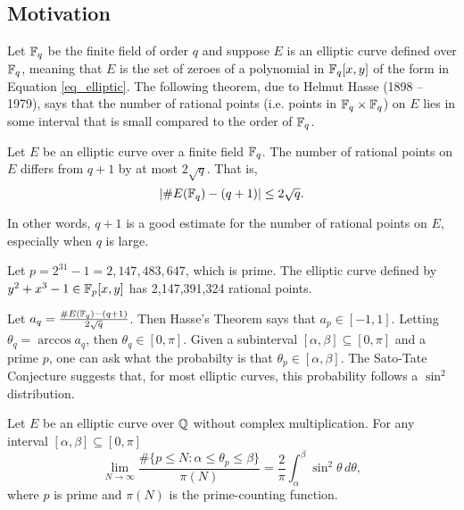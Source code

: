 \subsection{Motivation}

Let $\mathbb{F}_q$ be the finite field of order $q$ and suppose $E$ is an elliptic curve defined over $\mathbb{F}_q$,
meaning that $E$ is the set of zeroes of a polynomial in $\mathbb{F}_q[x,y]$ of the form in Equation \ref{eq_elliptic}.
The following theorem, due to Helmut Hasse (1898 -- 1979), says that
the number of rational points (i.e. points in $\mathbb{F}_q \times \mathbb{F}_q$) on $E$
lies in some interval that is small compared to the order of $\mathbb{F}_q$.
\begin{theorem}[Hasse]
  Let $E$ be an elliptic curve over a finite field $\mathbb{F}_q$.
  The number of rational points on $E$ differs from $q + 1$ by at most $2 \sqrt q$. That is,
  \[ | \#E(\mathbb{F}_q) - (q + 1) | \leq 2 \sqrt q. \]
\end{theorem}
In other words,
$q + 1$ is a good estimate for the number of rational points on $E$,
especially when $q$ is large.

\begin{example}
  Let $p = 2^{31} - 1 = 2,147,483,647$, which is prime.
  The elliptic curve defined by $y^2 + x^3 - 1 \in \mathbb{F}_p[x,y]$ has 2,147,391,324 rational points.
\end{example}

Let $a_q = \frac {\#E(\mathbb{F}_q) - (q + 1)} {2\sqrt q}$.
Then Hasse's Theorem says that $a_p \in [-1, 1]$.
Letting $\theta_q = \arccos a_q$, then $\theta_q \in [0, \pi]$.
Given a subinterval $[\alpha, \beta] \subseteq [0, \pi]$ and a prime $p$,
one can ask what the probabilty is that $\theta_p \in [\alpha, \beta]$.
The Sato-Tate Conjecture suggests that, for most elliptic curves, this probability follows a $\sin^2$ distribution.

\begin{conjecture}
  Let $E$ be an elliptic curve over $\mathbb{Q}$ without complex multiplication.
  For any interval $[\alpha, \beta] \subseteq [0, \pi]$
  \[ \lim_{N \to \infty}
    \frac {\#\{ p \leq N : \alpha \leq \theta_p \leq \beta \}} {\pi(N)} =
    \frac 2 \pi \int_{\alpha}^{\beta} \sin^2 \theta\,d\theta, \]
  where $p$ is prime and $\pi(N)$ is the prime-counting function.
\end{conjecture}

